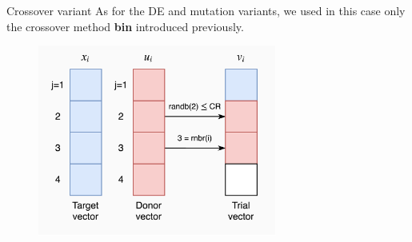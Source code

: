 \documentclass[xcolor={usenames}]{beamer}
\begin{document}
  \begin{frame}{Crossover variant}
	As for the DE and mutation variants, we used in this case only the crossover method \textbf{bin} introduced previously.
	\begin{figure}
		\centering
		\includegraphics[width=0.7\textwidth]{../figures/bin-3.png}
	\end{figure}
  \end{frame}
  
\end{document}
